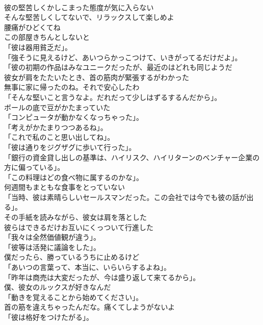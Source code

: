 \documentclass[8pt]{extreport}
\begin{document}
\begin{CJK}{UTF8}{min}
\\	彼の堅苦しくかしこまった態度が気に入らない	
\\	そんな堅苦しくしてないで、リラックスして楽しめよ	
\\	腰痛がひどくてね	
\\	この部屋きちんとしないと	
\\	「彼は器用貧乏だ」。	
\\	「強そうに見えるけど、あいつらかっこつけて、いきがってるだけだよ」。	
\\	「彼の初期の作品はみなユニークだったが、最近のはどれも同じようだ
\\	彼女が肩をたたいたとき、首の筋肉が緊張するがわかった	
\\	無事に家に帰ったのね。それで安心したわ	
\\	「そんな堅いこと言うなよ。だれだって少しはずるするんだから」。	
\\	ボールの底で豆がかたまっていた	
\\	「コンピュータが動かなくなっちゃった」。	
\\	「考えがかたまりつつあるね」。	
\\	「これで私のこと思い出してね」。	
\\	「彼は通りをジグザグに歩いて行った」。	
\\	「銀行の資金貸し出しの基準は、ハイリスク、ハイリターンのベンチャー企業の方に偏っている」。	
\\	「この料理はどの食べ物に属するのかな」。	
\\	何週間もまともな食事をとっていない	
\\	「当時、彼は素晴らしいセールスマンだった。この会社では今でも彼の話が出る」。	
\\	その手紙を読みながら、彼女は肩を落とした	
\\	彼らはできるだけお互いにくっついて行進した	
\\	「我々は全然価値観が違う」。	
\\	「彼等は活発に議論をした」。	
\\	僕だったら、勝っているうちに止めるけど	
\\	「あいつの言葉って、本当に、いらいらするよね」。	
\\	「昨年は商売は大変だったが、今は盛り返して来てるから」。	
\\	僕、彼女のルックスが好きなんだ	
\\	「動きを覚えることから始めてください」。	
\\	首の筋を違えちゃったんだな。痛くてしようがないよ	
\\	「彼は格好をつけたがる」。	

\end{CJK}
\end{document}
